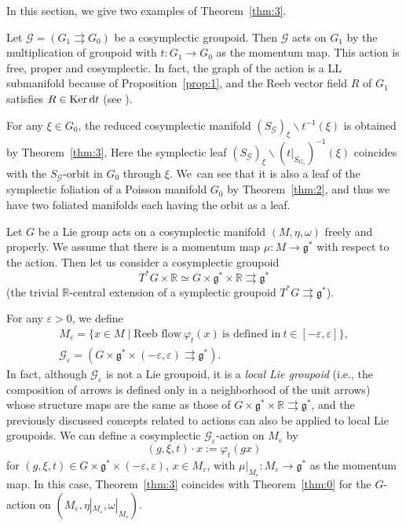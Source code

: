 \documentclass[pdftex]{sigma}
\numberwithin{equation}{section}
\begin{document}
In this section, we give two examples of Theorem~\ref{thm:3}.

\begin{Example}
 Let $\mathcal{G}=(G_1\rightrightarrows G_0)$ be a cosymplectic groupoid. Then $\mathcal{G}$ acts on $G_1$ by the multiplication of groupoid with $t\colon G_1\to G_0$ as the momentum map. This action is free, proper and cosymplectic. In fact, the graph of the action is a LL submanifold because of Proposition~\ref{prop:1}, and the Reeb vector field $R$ of $G_1$ satisfies $R\in \operatorname{Ker}{\rm d}t$ (see \cite{fernandes2023cosymplectic}).

 For any $\xi\in G_0$, the reduced cosymplectic manifold $(S_{\mathcal{G}})_\xi\backslash t^{-1}(\xi)$ is obtained by Theorem~\ref{thm:3}. Here the symplectic leaf $(S_{\mathcal{G}})_\xi\backslash (t|_{S_{G_1}})^{-1}(\xi)$ coincides with the $S_\mathcal{G}$-orbit in $G_0$ through $\xi$. We~can see that it is also a leaf of the symplectic foliation of a Poisson manifold $G_0$ by Theorem~\ref{thm:2}, and thus we have two foliated manifolds each having the orbit as a leaf.
\end{Example}

\begin{Example}
 Let $G$ be a Lie group acts on a cosymplectic manifold $(M,\eta,\omega)$ freely and properly. We assume that there is a momentum map $\mu\colon M\to\mathfrak{g}^\ast$ with respect to the action. Then let us consider a cosymplectic groupoid
 \[T^\ast G\times\mathbb{R}\simeq G\times\mathfrak{g}^\ast\times\mathbb{R}\rightrightarrows\mathfrak{g}^\ast\]
 (the trivial $\mathbb{R}$-central extension of a symplectic groupoid $T^\ast G\rightrightarrows\mathfrak{g}^\ast$).

 For any $\varepsilon>0$, we define
 \begin{gather*}
 M_\varepsilon=\{x\in M \mid \text{Reeb flow}\ \varphi_t(x)\ \text{is defined in}\ t\in[-\varepsilon,\varepsilon] \},\\
 \mathcal{G}_\varepsilon=(G\times\mathfrak{g}^\ast\times(-\varepsilon,\varepsilon)\rightrightarrows\mathfrak{g}^\ast).
 \end{gather*}
 In fact, although $\mathcal{G}_\varepsilon$ is not a Lie groupoid, it is a \textit{local Lie groupoid} (i.e., the composition of arrows is defined only in a neighborhood of the unit arrows) whose structure maps are the same as those of $G\times\mathfrak{g}^\ast\times\mathbb{R}\rightrightarrows\mathfrak{g}^\ast$, and the previously discussed concepts related to actions can also be applied to local Lie groupoids. We can define a cosymplectic $\mathcal{G}_\varepsilon$-action on $M_\varepsilon$ by
 \[(g,\xi,t)\cdot x:=\varphi_t(gx)\]
 for $(g,\xi,t)\in G\times\mathfrak{g}^\ast\times(-\varepsilon,\varepsilon)$, $ x\in M_\varepsilon$, with $\mu|_{M_\varepsilon}\colon M_\varepsilon\to\mathfrak{g}^\ast$ as the momentum map. In this case, Theorem~\ref{thm:3} coincides with Theorem~\ref{thm:0} for the $G$-action on $(M_\varepsilon,\eta|_{M_\varepsilon},\omega|_{M_\varepsilon})$.
\end{Example}
\end{document}
